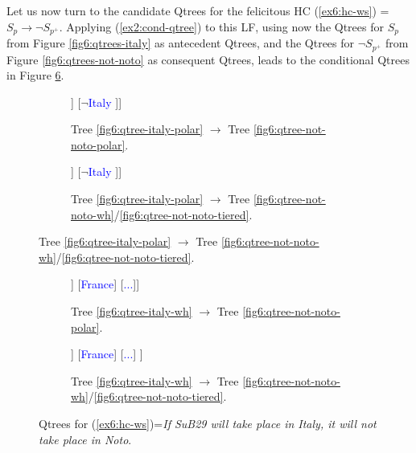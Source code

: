 Let us now turn to the candidate Qtrees for the felicitous HC (\ref{ex6:hc-ws}) = $S_p \rightarrow \neg S_{p^+}$. Applying (\ref{ex2:cond-qtree}) to this LF, using now the Qtrees for $S_p$ from Figure \ref{fig6:qtrees-italy} as antecedent Qtrees, and  the Qtrees for $\neg S_{p^+}$ from Figure \ref{fig6:qtrees-not-noto} as consequent Qtrees, leads to the conditional Qtrees in Figure \ref{fig6:qtrees-hc-ws}. 

\begin{figure}[H]
\centering
\begin{subfigure}[b]{.45\linewidth}
	\centering
	\scalebox{1}
	{\begin{forest}
			[CS [\textcolor{blue}{Italy} [\textcolor{orange}{Noto}][\fbox{$\neg$\textcolor{orange}{Noto}$\cap$\textcolor{blue}{Italy}}]] [{$\neg$\textcolor{blue}{Italy}} ]]
	\end{forest}}
	\caption[]{Tree \ref{fig6:qtree-italy-polar} $\rightarrow$ Tree \ref{fig6:qtree-not-noto-polar}.}\label{fig6:tree-hc-ws-polar-polar}
\end{subfigure}\hfill
\begin{subfigure}[b]{.45\linewidth}
	\centering
	\scalebox{1}
	{\begin{forest}
			[CS [\textcolor{blue}{Italy} [\textcolor{orange}{Noto}] [\fbox{\textcolor{orange}{Rome}}] [\fbox{\textcolor{orange}{...}}]] [{$\neg$\textcolor{blue}{Italy}} ]]
	\end{forest}}
	\caption[]{Tree \ref{fig6:qtree-italy-polar} $\rightarrow$ Tree \ref{fig6:qtree-not-noto-wh}/\ref{fig6:qtree-not-noto-tiered}.}\label{fig6:tree-hc-ws-polar-wh}
\end{subfigure}
\end{figure}
\begin{figure}[H]
\ContinuedFloat
\centering
\begin{subfigure}[b]{.45\linewidth}
	\centering
	\scalebox{1}
	{\begin{forest}
			[CS [\textcolor{blue}{Italy}[\textcolor{orange}{Noto}][\fbox{$\neg$\textcolor{orange}{Noto}$\cap$\textcolor{blue}{Italy}}]] [\textcolor{blue}{France}] [\textcolor{blue}{...}]]
	\end{forest}}
	\caption[]{Tree \ref{fig6:qtree-italy-wh} $\rightarrow$ Tree \ref{fig6:qtree-not-noto-polar}.}\label{fig6:tree-hc-ws-wh-polar}
\end{subfigure}\hfill
\begin{subfigure}[b]{.45\linewidth}
	\centering
	\scalebox{1}
	{\begin{forest}
			[CS [\textcolor{blue}{Italy}[\textcolor{orange}{Noto}] [\fbox{\textcolor{orange}{Rome}}] [\fbox{\textcolor{orange}{...}}]] [\textcolor{blue}{France}] [\textcolor{blue}{...}] ]
	\end{forest}}
	\caption[]{Tree \ref{fig6:qtree-italy-wh} $\rightarrow$ Tree \ref{fig6:qtree-not-noto-wh}/\ref{fig6:qtree-not-noto-tiered}.}\label{fig6:tree-hc-ws-wh-wh}
\end{subfigure}
\caption[]{Qtrees for (\ref{ex6:hc-ws})=\textit{If SuB29 will take place in Italy, it will not take place in Noto}.}
\label{fig6:qtrees-hc-ws}
\end{figure}


